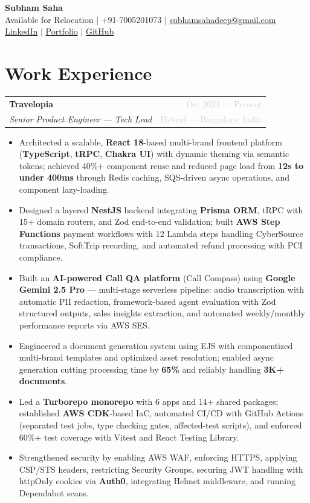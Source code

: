 \documentclass[letterpaper,10.5pt]{article}
\newcommand{\resumeItem}[1]{\item\small{#1}}
\newcommand{\resumeSubheading}[4]{
  \vspace{2pt}
  \begin{tabularx}{\textwidth}{Xr}
    \textbf{#1} & \textcolor{lightgray}{\small #2} \\
    \textit{\small #3} & \textcolor{lightgray}{\small #4} \\
  \end{tabularx}
  \vspace{-4pt}
}
\begin{document}
\begin{center}
  {\LARGE\textbf{Subham Saha}} \\[6pt]
  \small
  Available for Relocation \quad $|$ \quad +91-7005201073 \quad $|$ \quad
  \href{mailto:subhamsahadeep@gmail.com}{subhamsahadeep@gmail.com} \\[3pt]
  \href{https://www.linkedin.com/in/subhamsahadeep/}{LinkedIn} \quad $|$ \quad
  \href{https://subhamsaha.dev}{Portfolio} \quad $|$ \quad
  \href{https://github.com/Subhamsahadeep}{GitHub}
\end{center}

\section{Work Experience}

\resumeSubheading
  {Travelopia}{Oct 2023 --- Present}
  {Senior Product Engineer --- Tech Lead}{Hybrid --- Bangalore, India}

\begin{itemize}[leftmargin=14pt, itemsep=1.5pt, parsep=0pt, topsep=4pt]
  \resumeItem{Architected a scalable, \textbf{React 18}-based multi-brand frontend platform (\textbf{TypeScript}, \textbf{tRPC}, \textbf{Chakra UI}) with dynamic theming via semantic tokens; achieved 40\%+ component reuse and reduced page load from \textbf{12s to under 400ms} through Redis caching, SQS-driven async operations, and component lazy-loading.}
  \resumeItem{Designed a layered \textbf{NestJS} backend integrating \textbf{Prisma ORM}, tRPC with 15+ domain routers, and Zod end-to-end validation; built \textbf{AWS Step Functions} payment workflows with 12 Lambda steps handling CyberSource transactions, SoftTrip recording, and automated refund processing with PCI compliance.}
  \resumeItem{Built an \textbf{AI-powered Call QA platform} (Call Compass) using \textbf{Google Gemini 2.5 Pro} --- multi-stage serverless pipeline: audio transcription with automatic PII redaction, framework-based agent evaluation with Zod structured outputs, sales insights extraction, and automated weekly/monthly performance reports via AWS SES.}
  \resumeItem{Engineered a document generation system using EJS with componentized multi-brand templates and optimized asset resolution; enabled async generation cutting processing time by \textbf{65\%} and reliably handling \textbf{3K+ documents}.}
  \resumeItem{Led a \textbf{Turborepo monorepo} with 6 apps and 14+ shared packages; established \textbf{AWS CDK}-based IaC, automated CI/CD with GitHub Actions (separated test jobs, type checking gates, affected-test scripts), and enforced 60\%+ test coverage with Vitest and React Testing Library.}
  \resumeItem{Strengthened security by enabling AWS WAF, enforcing HTTPS, applying CSP/STS headers, restricting Security Groups, securing JWT handling with httpOnly cookies via \textbf{Auth0}, integrating Helmet middleware, and running Dependabot scans.}
\end{itemize}
\end{document}
